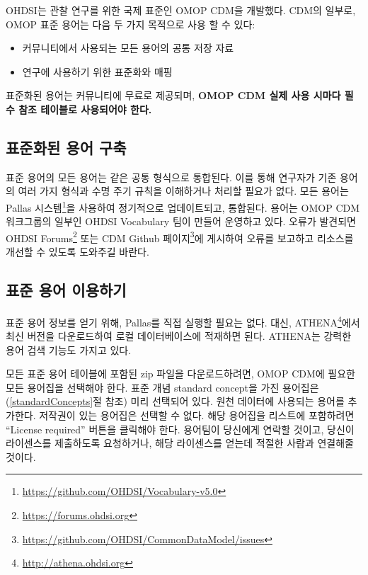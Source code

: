 \documentclass[10.5pt]{book}
\providecommand{\tightlist}{%
  \setlength{\itemsep}{0pt}\setlength{\parskip}{0pt}}
\let\rmarkdownfootnote\footnote%
\def\footnote{\protect\rmarkdownfootnote}
\theoremstyle{definition}
\theoremstyle{definition}
\theoremstyle{definition}
\theoremstyle{remark}
\begin{document}
OHDSI는 관찰 연구를 위한 국제 표준인 OMOP CDM을 개발했다. CDM의 일부로,
OMOP 표준 용어는 다음 두 가지 목적으로 사용 할 수 있다:

\begin{itemize}
\tightlist
\item
  커뮤니티에서 사용되는 모든 용어의 공통 저장 자료
\item
  연구에 사용하기 위한 표준화와 매핑
\end{itemize}

표준화된 용어는 커뮤니티에 무료로 제공되며, \textbf{OMOP CDM 실제 사용
시마다 필수 참조 테이블로 사용되어야 한다.}

\subsection{표준화된 용어 구축}\label{--}

표준 용어의 모든 용어는 같은 공통 형식으로 통합된다. 이를 통해 연구자가
기존 용어의 여러 가지 형식과 수명 주기 규칙을 이해하거나 처리할 필요가
없다. 모든 용어는 Pallas 시스템\footnote{\url{https://github.com/OHDSI/Vocabulary-v5.0}}을
사용하여 정기적으로 업데이트되고, 통합된다. 용어는 OMOP CDM 워크그룹의
일부인 OHDSI Vocabulary 팀이 만들어 운영하고 있다. 오류가 발견되면 OHDSI
Forums\footnote{\url{https://forums.ohdsi.org}} 또는 CDM Github
페이지\footnote{\url{https://github.com/OHDSI/CommonDataModel/issues}}에
게시하여 오류를 보고하고 리소스를 개선할 수 있도록 도와주길
바란다.

\subsection{표준 용어 이용하기}\label{accessVocabularies}

표준 용어 정보를 얻기 위해, Pallas를 직접 실행할 필요는 없다. 대신,
ATHENA\footnote{\url{http://athena.ohdsi.org}}에서 최신 버전을
다운로드하여 로컬 데이터베이스에 적재하면 된다. ATHENA는 강력한 용어
검색 기능도 가지고 있다. 

모든 표준 용어 테이블에 포함된 zip 파일을 다운로드하려면, OMOP CDM에
필요한 모든 용어집을 선택해야 한다. 표준 개념 standard concept을 가진
용어집은 (\ref{standardConcepts}절 참조) 미리 선택되어 있다. 원천
데이터에 사용되는 용어를 추가한다. 저작권이 있는 용어집은 선택할 수
없다. 해당 용어집을 리스트에 포함하려면 ``License required'' 버튼을
클릭해야 한다. 용어팀이 당신에게 연락할 것이고, 당신이 라이센스를
제출하도록 요청하거나, 해당 라이센스를 얻는데 적절한 사람과 연결해줄
것이다.
\end{document}
